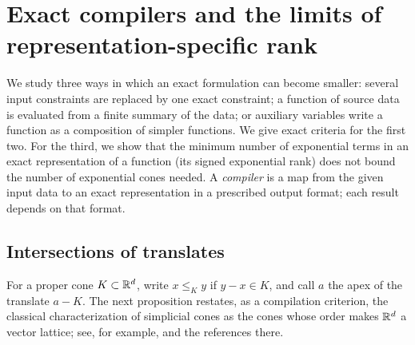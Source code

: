 \section{Exact compilers and the limits of representation-specific rank}
\label{sec:exact-compilers}

We study three ways in which an exact formulation can become smaller:
several input constraints are replaced by one exact constraint; a
function of source data is evaluated from a finite summary of the data;
or auxiliary variables write a function as a composition of simpler
functions. We give exact criteria for the first two. For the third, we
show that the minimum number of exponential terms in an exact
representation of a function (its signed exponential rank) does not bound
the number of exponential cones needed. A \emph{compiler} is a map from
the given input data to an exact representation in a prescribed output
format; each result depends on that format.

\subsection{Intersections of translates}

For a proper cone $K\subset\mathbb R^d$, write $x\leq_K y$ if $y-x\in K$,
and call $a$ the apex of the translate $a-K$.
The next proposition restates, as a compilation criterion, the classical
characterization of simplicial cones as the cones whose order makes
$\mathbb R^d$ a vector lattice; see, for example,
\citet[Introduction]{Nemeth2004} and the references there.

